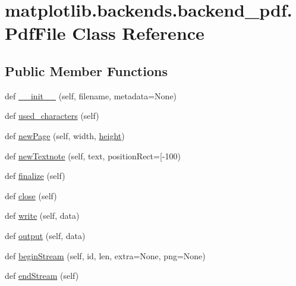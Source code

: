 \hypertarget{classmatplotlib_1_1backends_1_1backend__pdf_1_1PdfFile}{}\section{matplotlib.\+backends.\+backend\+\_\+pdf.\+Pdf\+File Class Reference}
\label{classmatplotlib_1_1backends_1_1backend__pdf_1_1PdfFile}
\subsection*{Public Member Functions}
\begin{DoxyCompactItemize}
\item 
def \hyperlink{classmatplotlib_1_1backends_1_1backend__pdf_1_1PdfFile_a30e69dd6b158452832fd38c1ae042f6f}{\+\_\+\+\_\+init\+\_\+\+\_\+} (self, filename, metadata=None)
\item 
def \hyperlink{classmatplotlib_1_1backends_1_1backend__pdf_1_1PdfFile_ae4e34367a53e29309b254778f7c65a6f}{used\+\_\+characters} (self)
\item 
def \hyperlink{classmatplotlib_1_1backends_1_1backend__pdf_1_1PdfFile_aad0a71eba20f52eb499f5c6dbddabd5c}{new\+Page} (self, width, \hyperlink{classmatplotlib_1_1backends_1_1backend__pdf_1_1PdfFile_a470c2997c5b485ac4da9f54faddc79c8}{height})
\item 
def \hyperlink{classmatplotlib_1_1backends_1_1backend__pdf_1_1PdfFile_af535456f0a4230849bb8a3e32ec622d1}{new\+Textnote} (self, text, position\+Rect=\mbox{[}-\/100)
\item 
def \hyperlink{classmatplotlib_1_1backends_1_1backend__pdf_1_1PdfFile_a269b86ce9e4f4a71875f6bbb5463295d}{finalize} (self)
\item 
def \hyperlink{classmatplotlib_1_1backends_1_1backend__pdf_1_1PdfFile_a35b8e60879050e78e7189c37b34a5c9e}{close} (self)
\item 
def \hyperlink{classmatplotlib_1_1backends_1_1backend__pdf_1_1PdfFile_a38d3f7d088f25278b08b924bb0834c38}{write} (self, data)
\item 
def \hyperlink{classmatplotlib_1_1backends_1_1backend__pdf_1_1PdfFile_afcb605689baed572fc20d60d3b544bcc}{output} (self, data)
\item 
def \hyperlink{classmatplotlib_1_1backends_1_1backend__pdf_1_1PdfFile_a5926ff8af586a3f792b53e1e82b0cadb}{begin\+Stream} (self, id, len, extra=None, png=None)
\item 
def \hyperlink{classmatplotlib_1_1backends_1_1backend__pdf_1_1PdfFile_ad4d92ff03afdfaa57eba0fb98d343a88}{end\+Stream} (self)

\end{DoxyCompactItemize}
